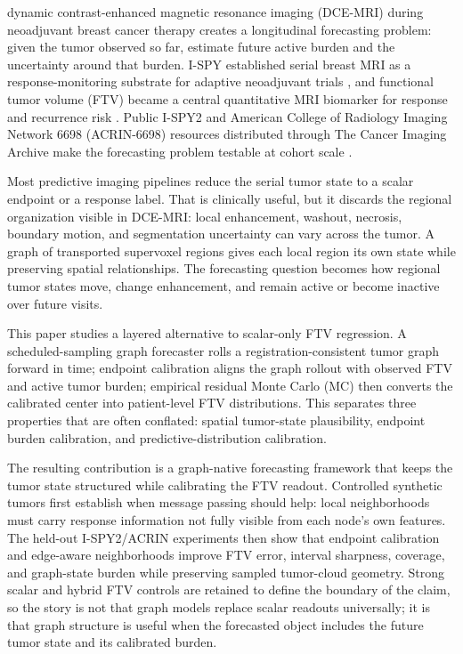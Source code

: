 \documentclass[journal,twoside,print]{ieeecolor}
\begin{document}
 dynamic contrast-enhanced magnetic resonance imaging
(DCE-MRI) during neoadjuvant breast cancer therapy creates a longitudinal
forecasting problem: given the tumor observed so far, estimate future active
burden and the uncertainty around that burden. I-SPY established serial breast
MRI as a response-monitoring substrate for adaptive neoadjuvant trials
\cite{barker2009ispy2}, and functional tumor volume (FTV) became a central
quantitative MRI biomarker for response and recurrence risk
\cite{hylton2012ispy,hylton2016ftv,li2020ispy2mri,onishi2023ftvvariation}.
Public I-SPY2 and American College of Radiology Imaging Network 6698
(ACRIN-6698) resources distributed through The Cancer Imaging Archive make the
forecasting problem testable at cohort scale
\cite{tciaispy2,tciaacrin6698}.

Most predictive imaging pipelines reduce the serial tumor state to a scalar
endpoint or a response label. That is clinically useful, but it discards the
regional organization visible in DCE-MRI: local enhancement, washout, necrosis,
boundary motion, and segmentation uncertainty can vary across the tumor. A
graph of transported supervoxel regions gives each local region its own state
while preserving spatial relationships. The forecasting question becomes how
regional tumor states move, change enhancement, and remain active or become
inactive over future visits.

This paper studies a layered alternative to scalar-only FTV regression. A
scheduled-sampling graph forecaster rolls a registration-consistent tumor graph
forward in time; endpoint calibration aligns the graph rollout with observed
FTV and active tumor burden; empirical residual Monte Carlo (MC) then converts
the calibrated center into patient-level FTV distributions. This separates
three properties that are often conflated: spatial tumor-state plausibility,
endpoint burden calibration, and predictive-distribution calibration.

The resulting contribution is a graph-native forecasting framework that keeps
the tumor state structured while calibrating the FTV readout. Controlled
synthetic tumors first establish when message passing should help: local
neighborhoods must carry response information not fully visible from each
node's own features. The held-out I-SPY2/ACRIN experiments then show that
endpoint calibration and edge-aware neighborhoods improve FTV error, interval
sharpness, coverage, and graph-state burden while preserving sampled
tumor-cloud geometry. Strong scalar and hybrid FTV controls are retained to
define the boundary of the claim, so the story is not that graph models replace
scalar readouts universally; it is that graph structure is useful when the
forecasted object includes the future tumor state and its calibrated burden.
\end{document}
